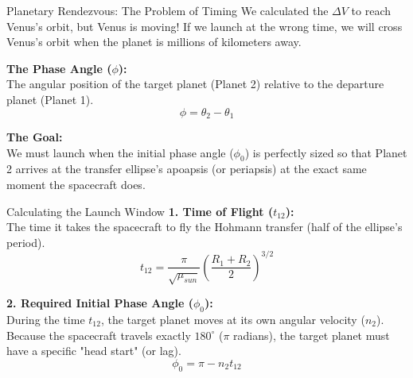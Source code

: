 \documentclass[11pt]{beamer}
\begin{document}
\begin{frame}{Planetary Rendezvous: The Problem of Timing}
    We calculated the $\Delta V$ to reach Venus's orbit, but Venus is moving! If we launch at the wrong time, we will cross Venus's orbit when the planet is millions of kilometers away.
    
    \vspace{0.3cm}
    \textbf{The Phase Angle ($\phi$):} \\
    The angular position of the target planet (Planet 2) relative to the departure planet (Planet 1).
    \begin{equation}
        \phi = \theta_2 - \theta_1
    \end{equation}
    
    \textbf{The Goal:} \\
    We must launch when the initial phase angle ($\phi_0$) is perfectly sized so that Planet 2 arrives at the transfer ellipse's apoapsis (or periapsis) at the exact same moment the spacecraft does.
\end{frame}

\begin{frame}{Calculating the Launch Window}
    \textbf{1. Time of Flight ($t_{12}$):} \\
    The time it takes the spacecraft to fly the Hohmann transfer (half of the ellipse's period).
    \begin{equation}
        t_{12} = \frac{\pi}{\sqrt{\mu_{sun}}} \left( \frac{R_1 + R_2}{2} \right)^{3/2}
    \end{equation}
    
    \textbf{2. Required Initial Phase Angle ($\phi_0$):} \\
    During the time $t_{12}$, the target planet moves at its own angular velocity ($n_2$). Because the spacecraft travels exactly $180^\circ$ ($\pi$ radians), the target planet must have a specific "head start" (or lag).
    \begin{equation}
        \phi_0 = \pi - n_2 t_{12}
    \end{equation}
\end{frame}
\end{document}
